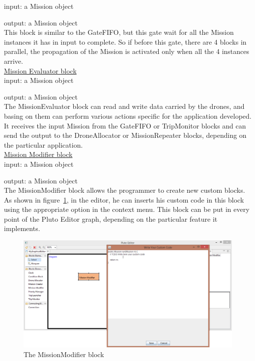 input: a Mission object

output: a Mission object
\\

This block is similar to the GateFIFO, but this gate wait for all the Mission instances it has in input to complete.
So if before this gate, there are 4 blocks in parallel, the propagation of the Mission is activated only when all the 4 instances arrive.
\\

\underline{Mission Evaluator block}
\\

input: a Mission object

output: a Mission object
\\

The MissionEvaluator block can read and write data carried by the drones, and basing on them can perform various actions specific for the application developed.
It receives the input Mission from the GateFIFO or TripMonitor blocks and can send the output to the DroneAllocator or MissionRepeater blocks, depending on the particular application.
\\

\underline{Mission Modifier block}\label{mm}
\\

input: a Mission object

output: a Mission object
\\

The MissionModifier block allows the programmer to create new custom blocks.
As shown in figure~\ref{fig:missionmodifier}, in the editor, he can inserts his custom code in this block using the appropriate option in the context menu.
This block can be put in every point of the Pluto Editor graph, depending on the particular feature it implements.
\\

\begin{figure}[H]
\centering
\includegraphics[width=\linewidth]
{pictures/MissionModifier.png}
  \caption{The MissionModifier block}
  \label{fig:missionmodifier}
\end{figure}

